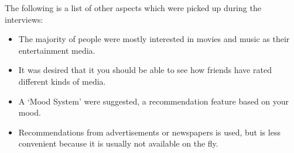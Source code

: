 The following is a list of other aspects which were picked up during the interviews:

\begin{itemize}
	\item The majority of people were mostly interested in movies and music as their entertainment media.
	\item It was desired that it you should be able to see how friends have rated different kinds of media.
	\item A ‘Mood System’ were suggested, a recommendation feature based on your mood.
	\item Recommendations from advertisements or newspapers is used, but is less convenient because it is usually not available on the fly.

\end{itemize}
